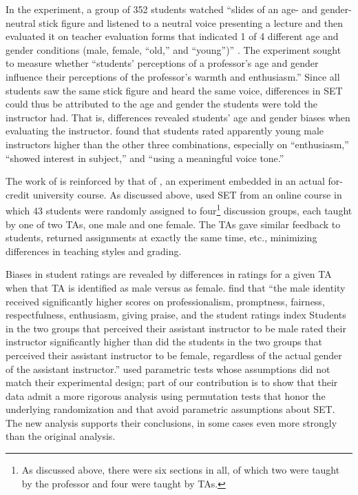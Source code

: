 \documentclass[12pt]{article}
\begin{document}
In the \citet{Arbuckle2003} experiment, a group of 352 students watched 
``slides of an age- and gender-neutral stick figure and listened to a neutral voice 
presenting a lecture and then evaluated it on teacher evaluation forms that indicated 
1 of 4 different age and gender conditions 
(male, female, ``old,'' and ``young'')'' \citealp[p.507]{Arbuckle2003}. 
The experiment sought to measure whether 
``students' perceptions of a professor's age and gender influence their perceptions of the 
professor's warmth and enthusiasm.'' 
Since all students saw the same stick figure and heard the same voice, differences in SET 
could thus be attributed to the age and gender the students were told the instructor had.
That is, differences revealed students' age and gender biases when evaluating the instructor. 
\citet{Arbuckle2003} found that students rated apparently young male instructors higher 
than the other three combinations, especially on ``enthusiasm,'' ``showed interest in subject,'' 
and ``using a meaningful voice tone.'' 

The work of \citet{Arbuckle2003} is reinforced by that of \citet{MacNell2014},
an experiment embedded in an actual for-credit university course. 
As discussed above, \citet{MacNell2014} used SET from an online course in which 
43 students were randomly assigned to four\footnote{%
As discussed above, there were six sections in all, of which two were taught by the professor and four
were taught by TAs.
} 
discussion groups, each taught by one of two TAs, one male and one female. 
The TAs gave similar feedback to students, returned assignments at exactly the same time, etc., 
minimizing differences in teaching styles and grading.

Biases in student ratings are revealed by differences in ratings for a given TA when that 
TA is identified as male versus as female.
\citet{MacNell2014} find that ``the male identity received significantly higher scores on professionalism, promptness, fairness, respectfulness, enthusiasm, giving praise, and the
student ratings index \textellipsis Students in the two groups that perceived their assistant
instructor to be male rated their instructor significantly higher than did the students in the
two groups that perceived their assistant instructor to be female, regardless of the actual gender
of the assistant instructor.'' 
\citet{MacNell2014} used parametric tests whose assumptions did not match their experimental
design; part of our contribution is to show that their data admit a more rigorous analysis
using permutation tests that honor the underlying randomization and that avoid parametric
assumptions about SET. 
The new analysis supports their conclusions, in some cases even more strongly than the original
analysis.
\end{document}
